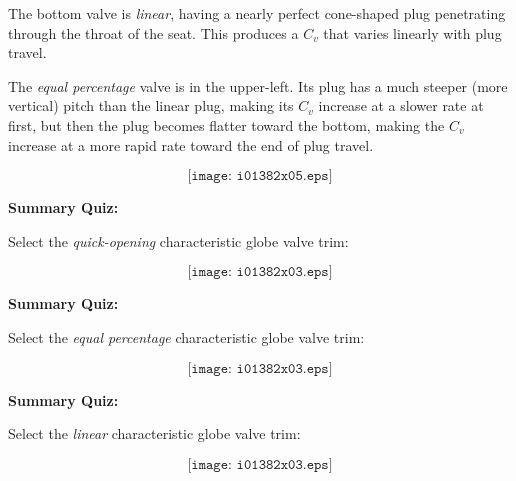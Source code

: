 \vskip 10pt

The bottom valve is {\it linear}, having a nearly perfect cone-shaped plug penetrating through the throat of the seat.  This produces a $C_v$ that varies linearly with plug travel.

\vskip 10pt

The {\it equal percentage} valve is in the upper-left.  Its plug has a much steeper (more vertical) pitch than the linear plug, making its $C_v$ increase at a slower rate at first, but then the plug becomes flatter toward the bottom, making the $C_v$ increase at a more rapid rate toward the end of plug travel.

\vskip 10pt

\filbreak

$$\texttt{[image: i01382x05.eps]}$$













\vfil \eject

\noindent
{\bf Summary Quiz:}

Select the {\it quick-opening} characteristic globe valve trim:

$$\texttt{[image: i01382x03.eps]}$$














\vfil \eject

\noindent
{\bf Summary Quiz:}

Select the {\it equal percentage} characteristic globe valve trim:

$$\texttt{[image: i01382x03.eps]}$$













\vfil \eject

\noindent
{\bf Summary Quiz:}

Select the {\it linear} characteristic globe valve trim:

$$\texttt{[image: i01382x03.eps]}$$





